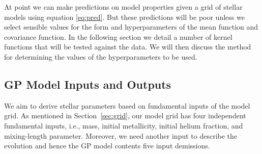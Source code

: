 At point we can make predictions on model properties given a grid of stellar models using equation \ref{eq:pred}.  But these predictions will be poor unless we select sensible values for the form and hyperparameters of the mean function and covariance function.  In the following section we detail a number of kernel functions that will be tested against the data.  We will then discuss the method for determining the values of the hyperparameters to be used.

\subsection{GP Model Inputs and Outputs}

We aim to derive stellar parameters based on fundamental inputs of the model grid. As mentioned in Section~\ref{sec:grid}, our model grid has four independent fundamental inputs, i.e., mass, initial metallicity, initial helium fraction, and mixing-length parameter. Moreover, we need another input to describe the evolution and hence the GP model contents five input demissions. 

